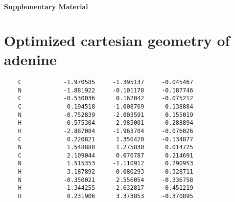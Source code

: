 \documentclass[12pt]{article}
\begin{document}
\thispagestyle{plain}
\renewcommand{\thefootnote}{\fnsymbol{footnote}}
\renewcommand\footnoterule{\vspace*{1pt}%
\hrule width 3.4in height 0.4pt \vspace*{5pt}} 
\setcounter{secnumdepth}{5}



\makeatletter 
\def\subsubsection{\@startsection{subsubsection}{3}{10pt}{-1.25ex plus -1ex minus -.1ex}{0ex plus 0ex}{\normalsize\bf}} 
\def\paragraph{\@startsection{paragraph}{4}{10pt}{-1.25ex plus -1ex minus -.1ex}{0ex plus 0ex}{\normalsize\textit}} 
\renewcommand\@biblabel[1]{#1}            
\renewcommand\@makefntext[1]%
{\noindent\makebox[0pt][r]{\@thefnmark\,}#1}
\makeatother 
\renewcommand{\figurename}{\small{Fig.}~}
\sectionfont{\large}
\subsectionfont{\normalsize} 

\fancyfoot{}
\fancyhead{}
\renewcommand{\headrulewidth}{1pt} 
\renewcommand{\footrulewidth}{1pt}
\setlength{\arrayrulewidth}{1pt}
\setlength{\columnsep}{6.5mm}
\setlength\bibsep{1pt}

\noindent\LARGE{\textbf{
Supplementary Material
}}
\vspace{0.6cm}
\tableofcontents
\newpage
\vspace{0.6cm}
\section{Optimized cartesian geometry of adenine}
{\small
\begin{verbatim}
    C            -1.970585     -1.395137     -0.045467 
    N            -1.881922     -0.101178     -0.187746 
    C            -0.530036      0.162042     -0.075212
    C             0.194518     -1.008769      0.138884 
    N            -0.752839     -2.003591      0.155019 
    H            -0.575304     -2.985001      0.288894 
    H            -2.887084     -1.963704     -0.076026 
    C             0.220821      1.350420     -0.134877 
    N             1.548880      1.275830      0.014725 
    C             2.109044      0.076787      0.214691 
    N             1.515353     -1.110912      0.290953
    H             3.187892      0.080293      0.328711 
    N            -0.350021      2.556054     -0.336758 
    H            -1.344255      2.632817     -0.451219 
    H             0.231906      3.373853     -0.370895 
\end{verbatim}}
\newpage
\end{document}
